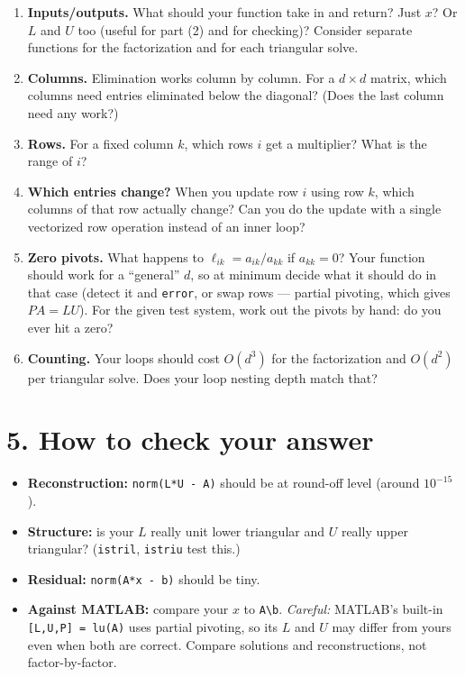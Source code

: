 \documentclass[11pt]{article}
\begin{document}
\begin{enumerate}
  \item \textbf{Inputs/outputs.} What should your function take in and
        return? Just $x$? Or $L$ and $U$ too (useful for part (2) and for
        checking)? Consider separate functions for the factorization and
        for each triangular solve.
  \item \textbf{Columns.} Elimination works column by column. For a
        $d\times d$ matrix, which columns need entries eliminated below
        the diagonal? (Does the last column need any work?)
  \item \textbf{Rows.} For a fixed column $k$, which rows $i$ get a
        multiplier? What is the range of $i$?
  \item \textbf{Which entries change?} When you update row $i$ using
        row $k$, which columns of that row actually change? Can you do
        the update with a single vectorized row operation instead of an
        inner loop?
  \item \textbf{Zero pivots.} What happens to $\ell_{ik}=a_{ik}/a_{kk}$
        if $a_{kk}=0$? Your function should work for a ``general''
        $d$, so at minimum decide what it should do in that case (detect
        it and \texttt{error}, or swap rows --- partial pivoting, which
        gives $PA=LU$). For the given test system, work out the pivots by
        hand: do you ever hit a zero?
  \item \textbf{Counting.} Your loops should cost $O(d^3)$ for the
        factorization and $O(d^2)$ per triangular solve. Does your loop
        nesting depth match that?
\end{enumerate}

\section*{5. How to check your answer}

\begin{itemize}
  \item \textbf{Reconstruction:} \texttt{norm(L*U - A)} should be at
        round-off level (around $10^{-15}$).
  \item \textbf{Structure:} is your $L$ really unit lower triangular and
        $U$ really upper triangular? (\texttt{istril}, \texttt{istriu}
        test this.)
  \item \textbf{Residual:} \texttt{norm(A*x - b)} should be tiny.
  \item \textbf{Against MATLAB:} compare your $x$ to \verb|A\b|.
        \emph{Careful:} MATLAB's built-in \texttt{[L,U,P] = lu(A)} uses
        partial pivoting, so its $L$ and $U$ may differ from yours even
        when both are correct. Compare solutions and reconstructions, not
        factor-by-factor.
\end{itemize}
\end{document}
